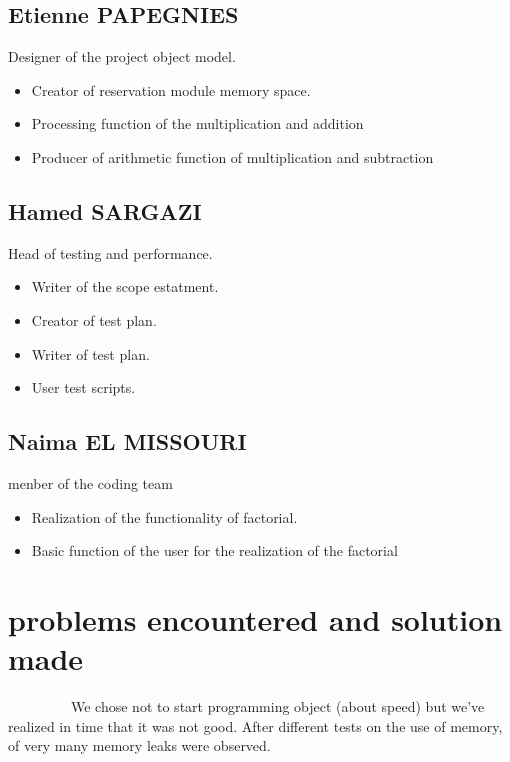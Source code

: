 \documentclass[11pt]{report}
\begin{document}
    \section{Etienne PAPEGNIES}

  Designer of the project object model.
        \begin{itemize}
           \item Creator of reservation module memory space.
            \item Processing function of the multiplication and addition
            \item Producer of arithmetic function of multiplication and subtraction
        \end{itemize}

   \section{Hamed SARGAZI}

 Head of testing and performance.
        \begin{itemize}
            \item Writer of the scope estatment.
            \item Creator of test plan.
	    \item Writer of test plan.
            \item User test scripts.
        \end{itemize}

 \section{Naima EL MISSOURI}
menber of the coding team
        \begin{itemize}
            \item Realization of the functionality of factorial.
	    \item Basic function of the user for the realization of the factorial
        \end{itemize}

 \chapter*{problems encountered and solution made }  
~~~~~~~~~We chose not to start programming object (about speed) but we've realized in time that it was not good.
After different tests on the use of memory, of very many memory leaks were observed.
\end{document}
